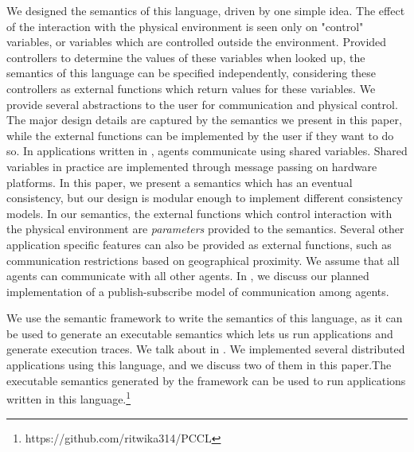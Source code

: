  We designed the semantics of this language, driven by one simple idea. The effect of the interaction with the physical environment is seen only on "control" variables, or variables which are controlled outside the environment. Provided controllers to determine the values of these variables when looked up, the semantics of this language can be specified independently, considering these controllers as external functions which return  values for these variables. We provide several abstractions to the user for communication and physical control. The major design details are captured by the semantics we present in this paper, while the external functions can be implemented by the user if they want to do so. In applications written in \rolang, agents communicate using shared variables. Shared variables in practice are implemented through message passing on hardware platforms. In this paper, we present a semantics which has an eventual consistency, but our design is modular enough to implement different consistency models. In our semantics, the external functions which control interaction with the physical environment are \emph{parameters} provided to the semantics. Several other application specific features can also be provided as external functions, such as communication restrictions based on geographical proximity. We assume that all agents can communicate with all other agents. In , we discuss our planned implementation of a publish-subscribe model of communication among agents. 

We use the \K semantic framework to write the semantics of this language, as it can be used to generate an executable semantics which lets us run applications and generate execution traces. We talk about \K in . We implemented several distributed applications using this language, and we discuss two of them in this paper.The executable semantics generated by the \K framework can be used to run applications written in this language.\footnote{https://github.com/ritwika314/PCCL} 